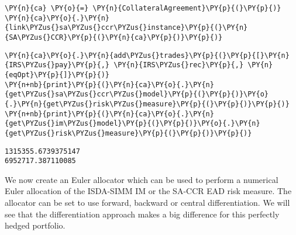 \begin{tcolorbox}[breakable, size=fbox, boxrule=1pt, pad at break*=1mm,colback=cellbackground, colframe=cellborder]
\begin{Verbatim}[commandchars=\\\{\}]
\PY{n}{ca} \PY{o}{=} \PY{n}{CollateralAgreement}\PY{p}{(}\PY{p}{)}
\PY{n}{ca}\PY{o}{.}\PY{n}{link\PYZus{}sa\PYZus{}ccr\PYZus{}instance}\PY{p}{(}\PY{n}{SA\PYZus{}CCR}\PY{p}{(}\PY{n}{ca}\PY{p}{)}\PY{p}{)}
\end{Verbatim}
\end{tcolorbox}

    \begin{tcolorbox}[breakable, size=fbox, boxrule=1pt, pad at break*=1mm,colback=cellbackground, colframe=cellborder]
\begin{Verbatim}[commandchars=\\\{\}]
\PY{n}{ca}\PY{o}{.}\PY{n}{add\PYZus{}trades}\PY{p}{(}\PY{p}{[}\PY{n}{IRS\PYZus{}pay}\PY{p}{,} \PY{n}{IRS\PYZus{}rec}\PY{p}{,} \PY{n}{eqOpt}\PY{p}{]}\PY{p}{)}
\PY{n+nb}{print}\PY{p}{(}\PY{n}{ca}\PY{o}{.}\PY{n}{get\PYZus{}sa\PYZus{}ccr\PYZus{}model}\PY{p}{(}\PY{p}{)}\PY{o}{.}\PY{n}{get\PYZus{}risk\PYZus{}measure}\PY{p}{(}\PY{p}{)}\PY{p}{)}
\PY{n+nb}{print}\PY{p}{(}\PY{n}{ca}\PY{o}{.}\PY{n}{get\PYZus{}im\PYZus{}model}\PY{p}{(}\PY{p}{)}\PY{o}{.}\PY{n}{get\PYZus{}risk\PYZus{}measure}\PY{p}{(}\PY{p}{)}\PY{p}{)}
\end{Verbatim}
\end{tcolorbox}

    \begin{Verbatim}[commandchars=\\\{\}]
1315355.6739375147
6952717.387110085
    \end{Verbatim}

    We now create an Euler allocator which can be used to perform a
numerical Euler allocation of the ISDA-SIMM IM or the SA-CCR EAD risk
measure. The allocator can be set to use forward, backward or central
differentiation. We will see that the differentiation approach makes a
big difference for this perfectly hedged portfolio.

